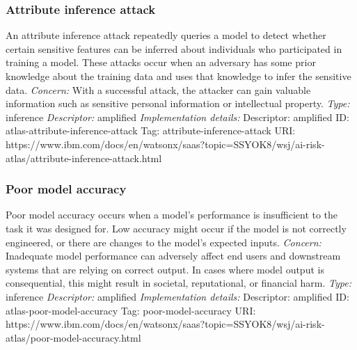 \documentclass{article}
\begin{document}
\subsubsection*{Attribute inference attack}
An attribute inference attack repeatedly queries a model to detect whether certain sensitive features can be inferred about individuals who participated in training a model. These attacks occur when an adversary has some prior knowledge about the training data and uses that knowledge to infer the sensitive data.\newline
\textit{Concern: }With a successful attack, the attacker can gain valuable information such as sensitive personal information or intellectual property.\newline\newline
\textit{Type: }inference\newline
\textit{Descriptor: }amplified \newline\newline
\textit{Implementation details:} \newline
Descriptor: amplified \newline
ID: atlas-attribute-inference-attack \newline
Tag: attribute-inference-attack \newline
URI:  https://www.ibm.com/docs/en/watsonx/saas?topic=SSYOK8/wsj/ai-risk-atlas/attribute-inference-attack.html\newline
\subsubsection*{Poor model accuracy}
Poor model accuracy occurs when a model's performance is insufficient to the task it was designed for. Low accuracy might occur if the model is not correctly engineered, or there are changes to the model's expected inputs.\newline
\textit{Concern: }Inadequate model performance can adversely affect end users and downstream systems that are relying on correct output. In cases where model output is consequential, this might result in societal, reputational, or financial harm.\newline\newline
\textit{Type: }inference\newline
\textit{Descriptor: }amplified \newline\newline
\textit{Implementation details:} \newline
Descriptor: amplified \newline
ID: atlas-poor-model-accuracy \newline
Tag: poor-model-accuracy \newline
URI:  https://www.ibm.com/docs/en/watsonx/saas?topic=SSYOK8/wsj/ai-risk-atlas/poor-model-accuracy.html\newline
\end{document}
